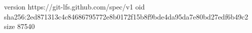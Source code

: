 version https://git-lfs.github.com/spec/v1
oid sha256:2ed871313c4c84686795772e8b0172f15b8f9bde4da95da7e80bd27edf6b49c2
size 87540
